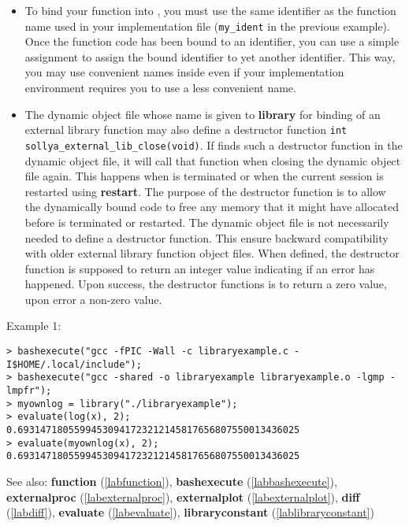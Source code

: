 \begin{itemize}
\item To bind your function into \sollya, you must use the same identifier as the
   function name used in your implementation file (\verb|my_ident| in the previous
   example). Once the function code has been bound to an identifier, you can use
   a simple assignment to assign the bound identifier to yet another identifier.
   This way, you may use convenient names inside \sollya even if your
   implementation environment requires you to use a less convenient name.

\item The dynamic object file whose name is given to \textbf{library} for binding of an
   external library function may also define a destructor function
   \verb|int sollya_external_lib_close(void)|.
   If \sollya finds such a destructor function in the dynamic object file, it
   will call that function when closing the dynamic object file again.
   This happens when \sollya is terminated or when the current \sollya session
   is restarted using \textbf{restart}.
   The purpose of the destructor function is to allow the dynamically bound code
   to free any memory that it might have allocated before \sollya is terminated 
   or restarted. 
   The dynamic object file is not necessarily needed to define a destructor
   function. This ensure backward compatibility with older \sollya external 
   library function object files.
   When defined, the destructor function is supposed to return an integer
   value indicating if an error has happened. Upon success, the destructor
   functions is to return a zero value, upon error a non-zero value.
\end{itemize}
\noindent Example 1: 
\begin{center}\begin{minipage}{15cm}\begin{Verbatim}[frame=single]
> bashexecute("gcc -fPIC -Wall -c libraryexample.c -I$HOME/.local/include");
> bashexecute("gcc -shared -o libraryexample libraryexample.o -lgmp -lmpfr");
> myownlog = library("./libraryexample");
> evaluate(log(x), 2);
0.69314718055994530941723212145817656807550013436025
> evaluate(myownlog(x), 2);
0.69314718055994530941723212145817656807550013436025
\end{Verbatim}
\end{minipage}\end{center}
See also: \textbf{function} (\ref{labfunction}), \textbf{bashexecute} (\ref{labbashexecute}), \textbf{externalproc} (\ref{labexternalproc}), \textbf{externalplot} (\ref{labexternalplot}), \textbf{diff} (\ref{labdiff}), \textbf{evaluate} (\ref{labevaluate}), \textbf{libraryconstant} (\ref{lablibraryconstant})
